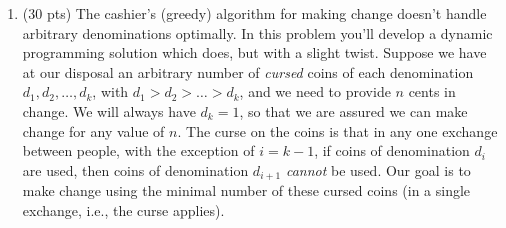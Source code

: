 \documentclass[12pt]{article}
\newcommand\tab[1][1cm]{\hspace*{#1}}
\begin{document}
\begin{enumerate}
\begin{enumerate}
\tab else if(length(A) == 1 and length(B) == 0):\\
\tab \tab n = n + A[0].dontation\\
\tab \tab return (A,n)\\
\tab tempTime = [0][0][0]\\
\tab maxDonation = 0\\
\tab for($i -\textgreater A$)\\
\tab \tab if($i.dontaion \textgreater maxDonation$):\\
\tab \tab \tab maxDonation = i.donation\\
\tab \tab \tab tempTime = i\\
\tab \tab if(i conflicts with memo[tempTime])
\tab \tab \tab memo[tempTime].append(i)
\tab x = maxDonaiton(memo[tempTime,[],0)\\
\tab if($x[1] \textgreater tempTime.donation$):\\
\tab \tab A.delete(tempTime)\\
\tab \tab maxDonation(A,B,n)\\
\tab else:\\
\tab \tab B.append(tempTime)\\
\tab \tab A.delete(tempTime)\\
\tab \tab n = n + tempTime.donation\\
\tab \tab maxDonation(A,B,n)\\
\pagebreak
    \item \label{2d} (10 points) Give a bottom-up dynamic programming algorithm.\\\\
Look at 2c, The memoization makes the algorithm bottom up. 
\pagebreak
\end{enumerate}

\item (30 pts) 
The cashier's (greedy) algorithm for making change doesn't handle arbitrary
denominations optimally. In this problem you'll develop a dynamic
programming solution which does, but with a slight twist. Suppose we
have at our disposal an arbitrary number of \emph{cursed} coins of each
denomination $d_1, d_2, \dotsc, d_k$, with $d_1 > d_2 > \dotsc > d_k$,
and we need to provide $n$ cents in change. We will always have
$d_k=1$, so that we are assured we can make change for any value of
$n$. The curse on the coins is that in any one exchange between people,
with the exception of $i=k-1$, if coins of denomination $d_i$ are used,
then coins of denomination $d_{i+1}$ \emph{cannot} be used. Our goal is
to make change using the minimal number of these cursed coins (in a
single exchange, i.e., the curse applies).
\pagebreak
	

\end{enumerate}
\end{document}
